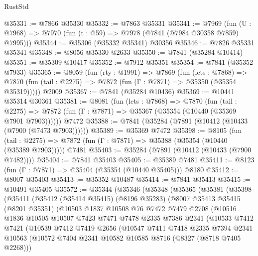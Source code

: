 \begin{lexlean}{RustStd}
\begin{coremodule}
@35331 := @7866 @35330
@35332 := @7863 @35331
@35341 := @7969
    (fun (U : @7968) => @7970 (fun (t : @59) => @7978 (@7841 (@7984 @30358 @7859) @7995)))
@35344 := @35306 (@35332 @35341) @30356
@35346 := @7826 @35331 @35341
@35348 := @8056 @35330 @2633
@35350 := @7841 (@35284 @10414)
@35351 := @35309 @10417
@35352 := @7912 @35351
@35354 := @7841 (@35352 @7933)
@35365 := @8059
    (fun (rty : @1991) =>
    @7869
      (fun (lets : @7868) =>
      @7870 (fun (tail : @2275) => @7872 (fun (Γ : @7871) => @35350 (@35354 @35319)))))
    @2009
@35367 := @7841 (@35284 @10436)
@35369 := @10441 @35314 @30361
@35381 := @8081
    (fun (lets : @7868) =>
    @7870
      (fun (tail : @2275) =>
      @7872 (fun (Γ : @7871) => @35367 (@35354 (@10440 (@35369 @7901 @7903))))))
    @7472
@35388 := @7841 (@35284 (@7891 (@10412 (@10433 (@7900 (@7473 @7903))))))
@35389 := @35369 @7472
@35398 := @8105
    (fun (tail : @2275) => @7872 (fun (Γ : @7871) => @35388 (@35354 (@10440 (@35389 @7903)))))
    @7481
@35403 := @35284 (@7891 (@10412 (@10433 (@7900 @7482))))
@35404 := @7841 @35403
@35405 := @35389 @7481
@35411 := @8123 (fun (Γ : @7871) => @35404 (@35354 (@10440 @35405))) @8180
@35412 := @8007 @35403
@35413 := @35352 @10487
@35414 := @7841 @35413
@35415 := @10491 @35405
@35572 := @35344
    (@35346
      (@35348
        (@35365
          (@35381
            (@35398
              (@35411
                (@35412
                  (@35414 @35415)
                  (@8196 @35283)
                  (@8007
                    @35413
                    @35415
                    (@8201 @35351)
                    (@10503
                      @1837
                      @10508
                      @76
                      @7472
                      @7479
                      @2708
                      (@10516
                        @1836
                        @10505
                        @10507
                        @7423
                        @7471
                        @7478
                        @2335
                        @7386
                        @2341
                        (@10533
                          @7412
                          @7421
                          (@10539
                            @7412
                            @7419
                            @2656
                            (@10547
                              @7411
                              @7418
                              @2335
                              @7394
                              @2341
                              @10563
                              (@10572 @7404 @2341 @10582 @10585 @8716 (@8327 (@8718 @7405 @2268)))

\end{coremodule}
\end{lexlean}
